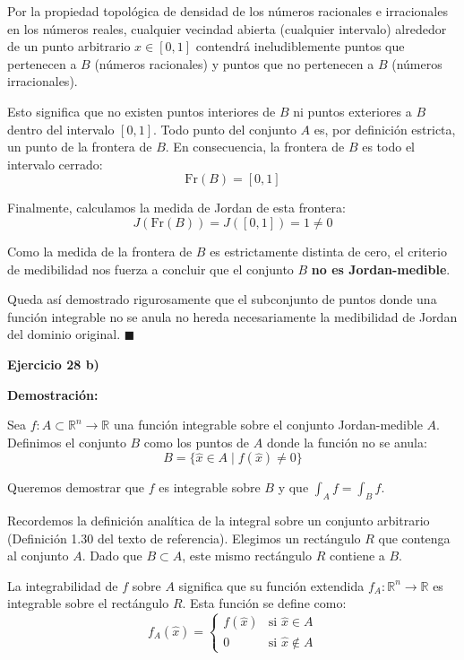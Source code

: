 \documentclass[11pt,letterpaper]{article}
\begin{document}
Por la propiedad topológica de densidad de los números racionales e irracionales en los números reales, cualquier vecindad abierta (cualquier intervalo) alrededor de un punto arbitrario $x \in [0,1]$ contendrá ineludiblemente puntos que pertenecen a $B$ (números racionales) y puntos que no pertenecen a $B$ (números irracionales).

Esto significa que no existen puntos interiores de $B$ ni puntos exteriores a $B$ dentro del intervalo $[0,1]$. Todo punto del conjunto $A$ es, por definición estricta, un punto de la frontera de $B$. En consecuencia, la frontera de $B$ es todo el intervalo cerrado:
\begin{equation*}
\text{Fr}(B) = [0, 1]
\end{equation*}

Finalmente, calculamos la medida de Jordan de esta frontera:
\begin{equation*}
J(\text{Fr}(B)) = J([0, 1]) = 1 \neq 0
\end{equation*}

Como la medida de la frontera de $B$ es estrictamente distinta de cero, el criterio de medibilidad nos fuerza a concluir que el conjunto $B$ \textbf{no es Jordan-medible}. 

Queda así demostrado rigurosamente que el subconjunto de puntos donde una función integrable no se anula no hereda necesariamente la medibilidad de Jordan del dominio original. \hfill $\blacksquare$

\textbf{Ejercicio 28 b)}

\textbf{Demostración:}

Sea $f: A \subset \mathbb{R}^n \rightarrow \mathbb{R}$ una función integrable sobre el conjunto Jordan-medible $A$. Definimos el conjunto $B$ como los puntos de $A$ donde la función no se anula:
\begin{equation*}
B = \{\hat{x} \in A \mid f(\hat{x}) \neq 0\}
\end{equation*}

Queremos demostrar que $f$ es integrable sobre $B$ y que $\int_A f = \int_B f$.

Recordemos la definición analítica de la integral sobre un conjunto arbitrario (Definición 1.30 del texto de referencia). Elegimos un rectángulo $R$ que contenga al conjunto $A$. Dado que $B \subset A$, este mismo rectángulo $R$ contiene a $B$. 

La integrabilidad de $f$ sobre $A$ significa que su función extendida $f_A: \mathbb{R}^n \rightarrow \mathbb{R}$ es integrable sobre el rectángulo $R$. Esta función se define como:
\begin{equation*}
f_A(\hat{x}) = 
\begin{cases} 
f(\hat{x}) & \text{si } \hat{x} \in A \\ 
0 & \text{si } \hat{x} \notin A 
\end{cases}
\end{equation*}
\end{document}
